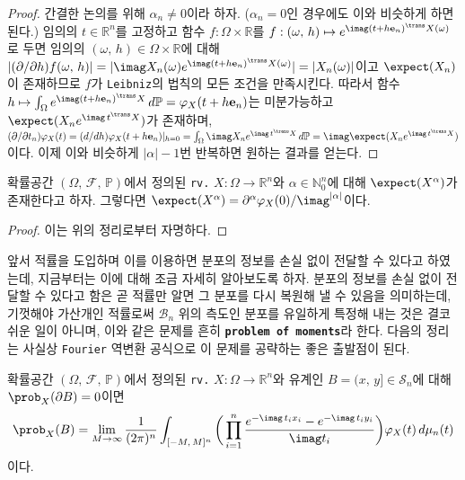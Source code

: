 \begin{proof}
    간결한 논의를 위해 $\alpha_n\ne0$이라 하자. ($\alpha_n=0$인 경우에도 이와 비슷하게 하면 된다.) 임의의 $t\in\mathbb{R}^n$를 고정하고 함수 $f:\Omega\times\mathbb{R}$를 $f:(\omega,\,h)\mapsto e^{\imag(t+h\mathbf{e}_n)^\trans X(\omega)}$로 두면 임의의 $(\omega,\,h)\in\Omega\times\mathbb{R}$에 대해 $|(\partial/\partial h)f(\omega,\,h)|=|\imag X_n(\omega)e^{\imag(t+h\mathbf{e}_n)^\trans X(\omega)}|=|X_n(\omega)|$이고 $\expect(X_n)$이 존재하므로 $f$가 \texttt{Leibniz}의 법칙의 모든 조건을 만족시킨다. 따라서 함수 $h\mapsto\int_\Omega e^{\imag(t+h\mathbf{e}_n)^\trans X}\,d\mathbb{P}=\varphi_X(t+h\mathbf{e}_n)$는 미분가능하고 $\expect(X_ne^{\imag\,t^\trans X})$가 존재하며, $(\partial/\partial t_n)\varphi_X(t)=(d/dh)\varphi_X(t+h\mathbf{e}_n)\vert_{h=0}=\int_\Omega\imag X_ne^{\imag\,t^\trans X}\,d\mathbb{P}=\imag\expect(X_ne^{\imag\,t^\trans X})$이다. 이제 이와 비슷하게 $|\alpha|-1$번 반복하면 원하는 결과를 얻는다.
\end{proof}

\begin{corollary}
    확률공간 $(\Omega,\,\mathcal{F},\,\mathbb{P})$에서 정의된 \texttt{rv.} $X:\Omega\to\mathbb{R}^n$와 $\alpha\in\mathbb{N}_0^n$에 대해 $\expect(X^\alpha)$가 존재한다고 하자. 그렇다면 $\expect(X^\alpha)=\partial^\alpha\varphi_X(0)/\imag^{|\alpha|}$이다.
\end{corollary}

\begin{proof}
    이는 위의 정리로부터 자명하다.
\end{proof}

앞서 적률을 도입하며 이를 이용하면 분포의 정보를 손실 없이 전달할 수 있다고 하였는데, 지금부터는 이에 대해 조금 자세히 알아보도록 하자. 분포의 정보를 손실 없이 전달할 수 있다고 함은 곧 적률만 알면 그 분포를 다시 복원해 낼 수 있음을 의미하는데, 기껏해야 가산개인 적률로써 $\mathcal{B}_n$ 위의 측도인 분포를 유일하게 특정해 내는 것은 결코 쉬운 일이 아니며, 이와 같은 문제를 흔히 \textbf{\texttt{problem of moments}}라 한다. 다음의 정리는 사실상 \texttt{Fourier} 역변환 공식으로 이 문제를 공략하는 좋은 출발점이 된다.

\begin{theorem}
    확률공간 $(\Omega,\,\mathcal{F},\,\mathbb{P})$에서 정의된 \texttt{rv.} $X:\Omega\to\mathbb{R}^n$와 유계인 $B=(x,\,y]\in\mathcal{S}_n$에 대해 $\prob_X(\partial B)=0$이면
    \begin{equation*}
        \prob_X(B)=\lim_{M\to\infty}\frac{1}{(2\pi)^n}\int_{[-M,\,M]^n}\bigg(\prod_{i=1}^n\frac{e^{-\imag\,t_ix_i}-e^{-\imag\,t_iy_i}}{\imag t_i}\bigg)\varphi_X(t)\,d\mu_n(t)
    \end{equation*}
    이다.\footnotemark
\end{theorem}

